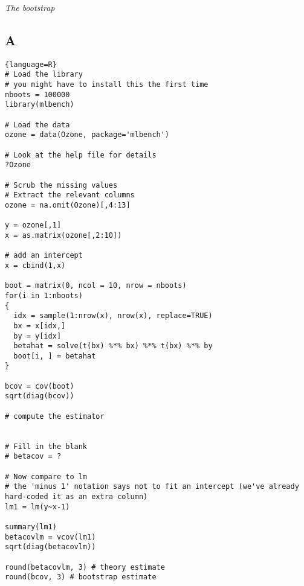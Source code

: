 \documentclass{article}
\begin{document}
\textit{The bootstrap}
\subsection*{A}

\begin{lstlisting}{language=R}
# Load the library
# you might have to install this the first time
nboots = 100000
library(mlbench)

# Load the data
ozone = data(Ozone, package='mlbench')

# Look at the help file for details
?Ozone

# Scrub the missing values
# Extract the relevant columns 
ozone = na.omit(Ozone)[,4:13]

y = ozone[,1]
x = as.matrix(ozone[,2:10])

# add an intercept
x = cbind(1,x)

boot = matrix(0, ncol = 10, nrow = nboots)
for(i in 1:nboots)
{
  idx = sample(1:nrow(x), nrow(x), replace=TRUE)
  bx = x[idx,]
  by = y[idx]
  betahat = solve(t(bx) %*% bx) %*% t(bx) %*% by
  boot[i, ] = betahat
}

bcov = cov(boot)
sqrt(diag(bcov))

# compute the estimator


# Fill in the blank
# betacov = ?

# Now compare to lm
# the 'minus 1' notation says not to fit an intercept (we've already hard-coded it as an extra column)
lm1 = lm(y~x-1)

summary(lm1)
betacovlm = vcov(lm1)
sqrt(diag(betacovlm))

round(betacovlm, 3) # theory estimate
round(bcov, 3) # bootstrap estimate


\end{lstlisting}
\end{document}
